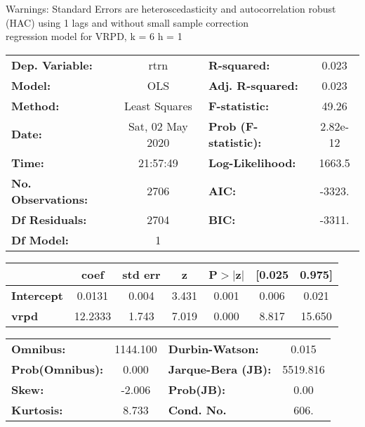 Warnings: \newline
 [1] Standard Errors are heteroscedasticity and autocorrelation robust (HAC) using 1 lags and without small sample correction\\ 

regression model for VRPD, k = 6 h = 1\begin{center}
\begin{tabular}{lclc}
\toprule
\textbf{Dep. Variable:}    &       rtrn       & \textbf{  R-squared:         } &     0.023   \\
\textbf{Model:}            &       OLS        & \textbf{  Adj. R-squared:    } &     0.023   \\
\textbf{Method:}           &  Least Squares   & \textbf{  F-statistic:       } &     49.26   \\
\textbf{Date:}             & Sat, 02 May 2020 & \textbf{  Prob (F-statistic):} &  2.82e-12   \\
\textbf{Time:}             &     21:57:49     & \textbf{  Log-Likelihood:    } &    1663.5   \\
\textbf{No. Observations:} &        2706      & \textbf{  AIC:               } &    -3323.   \\
\textbf{Df Residuals:}     &        2704      & \textbf{  BIC:               } &    -3311.   \\
\textbf{Df Model:}         &           1      & \textbf{                     } &             \\
\bottomrule
\end{tabular}
\begin{tabular}{lcccccc}
                   & \textbf{coef} & \textbf{std err} & \textbf{z} & \textbf{P$> |$z$|$} & \textbf{[0.025} & \textbf{0.975]}  \\
\midrule
\textbf{Intercept} &       0.0131  &        0.004     &     3.431  &         0.001        &        0.006    &        0.021     \\
\textbf{vrpd}      &      12.2333  &        1.743     &     7.019  &         0.000        &        8.817    &       15.650     \\
\bottomrule
\end{tabular}
\begin{tabular}{lclc}
\textbf{Omnibus:}       & 1144.100 & \textbf{  Durbin-Watson:     } &    0.015  \\
\textbf{Prob(Omnibus):} &   0.000  & \textbf{  Jarque-Bera (JB):  } & 5519.816  \\
\textbf{Skew:}          &  -2.006  & \textbf{  Prob(JB):          } &     0.00  \\
\textbf{Kurtosis:}      &   8.733  & \textbf{  Cond. No.          } &     606.  \\
\bottomrule
\end{tabular}
\end{center}

